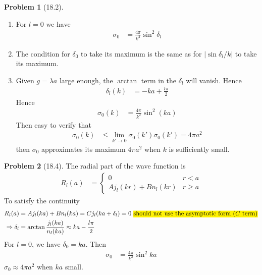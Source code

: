 \documentclass[twoside,11pt]{article}
\theoremstyle{definition}
\newtheorem{problem}{Problem}
\theoremstyle{remark}
\begin{document}
\begin{problem}[18.2]
\begin{enumerate}[label=(\alph*)]
\item For $l=0$ we have
\begin{align*}
    \sigma_0 &= 
    \frac{4\pi}{k^2}\sin^2\delta_l
\end{align*}

\item The condition for $\delta_0$ to take its maximum is the same as
for $|\sin\delta_l/k|$ to take its maximum.

\item Given $g=\lambda a$ large enough, the $\arctan$ term in the
$\delta_l$ will vanish. Hence 
\begin{align*}
    \delta_l(k) &= -ka + \frac{l\pi}{2}
\end{align*}
Hence 
\begin{align*}
    \sigma_0(k) &= \frac{4\pi}{k^2}\sin^2(ka)
\end{align*}
Then easy to verify that
\begin{align*}
    \sigma_0(k) &\leq \lim_{k'\rightarrow 0}\sigma_0(k')
    \sigma_0(k') = 4\pi a^2
\end{align*}
then $\sigma_0$ approximates its maximum $4\pi a^2$ when $k$ is sufficiently small.

\end{enumerate}
\end{problem}



\begin{problem}[18.4]
The radial part of the wave function is
\begin{align*}
    R_l(a) &= \begin{cases}
        0 & r < a\\
        Aj_l(kr) + Bn_l(kr) & r \geq a
    \end{cases}
\end{align*}
To satisfy the continuity
\begin{align*}
    R_l(a) &= A j_l(ka) + B n_l(ka) = C j_l(ka+\delta_l) = 0\text{ \hl{should not use the asymptotic form ($C$ term)}}\\
    \Rightarrow
    \delta_l &= \arctan \frac{j_l(ka)}{n_l(ka)} \approx
    ka - \frac{l\pi}{2}
\end{align*}
For $l=0$, we have $\delta_0=ka$.
Then 
\begin{align*}
    \sigma_0 &= \frac{4\pi}{k^2}\sin^2 ka
\end{align*}
$\sigma_0\approx 4\pi a^2$ when $ka$ small.
\end{problem}
\end{document}
